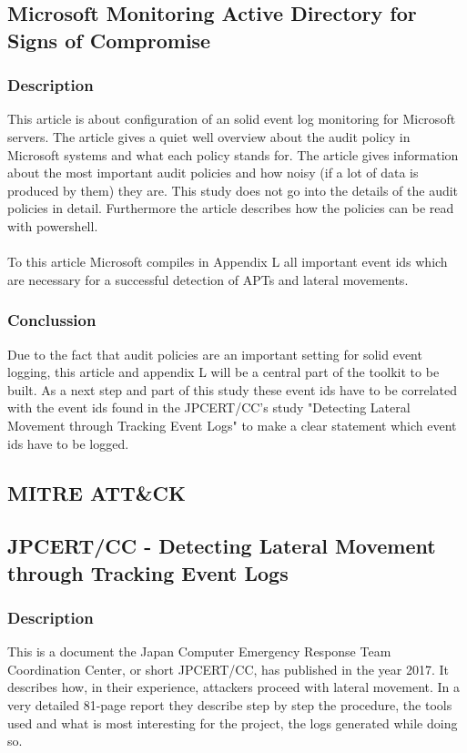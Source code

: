 \subsection{Microsoft Monitoring Active Directory for Signs of Compromise
}
\subsubsection{Description}
This article \cite{MSADSignsOfCompromise} is about configuration of an solid event log monitoring for Microsoft servers. The article gives a quiet well overview about the audit policy in Microsoft systems and what each policy stands for. The article gives information about the most important audit policies and how noisy (if a lot of data is produced by them) they are. This study does not go into the details of the audit policies in detail. Furthermore the article describes how the policies can be read with powershell.
\\\\
To this article Microsoft compiles in Appendix L \cite{MSAppendixL} all important event ids which are necessary for a successful detection of APTs and lateral movements.

\subsubsection{Conclussion}
Due to the fact that audit policies are an important setting for solid event logging, this article and appendix L will be a central part of the toolkit to be built. As a next step and part of this study these event ids have to be correlated with the event ids found in the JPCERT/CC's study "Detecting Lateral Movement through Tracking Event Logs" \cite{JPCERTDetectingLateralMovement} to make a clear statement which event ids have to be logged.

\subsection{MITRE ATT\&CK}

\subsection{JPCERT/CC - Detecting Lateral Movement through Tracking Event Logs}
\subsubsection{Description}
This is a document \cite{JPCERTDetectingLateralMovement} the Japan Computer Emergency Response Team Coordination Center, or short JPCERT/CC, has published in the year 2017. It describes how, in their experience, attackers proceed with lateral movement. In a very detailed 81-page report they describe step by step the procedure, the tools used and what is most interesting for the project, the logs generated while doing so.
